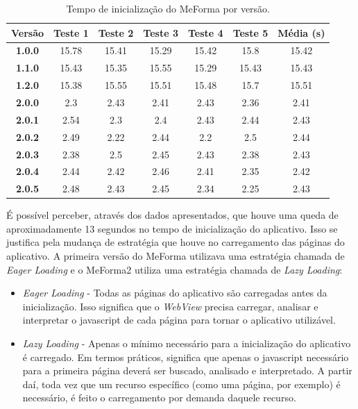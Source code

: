 \begin{table}[H]
\begin{center}
\caption{Tempo de inicialização do MeForma por versão.}
\begin{tabular}{ |c|c|c|c|c|c|c| }
\hline
 \textbf{Versão} & \textbf{Teste 1} & \textbf{Teste 2} & \textbf{Teste 3} & \textbf{Teste 4} & \textbf{Teste 5} & \textbf{Média (s)} \\ 
 \hline
 \textbf{1.0.0} & {15.78} &	{15.41} &	{15.29} &	{15.42} &	{15.8} &	{15.42} \\
 \hline 
 \textbf{1.1.0} & {15.43} &	{15.35} &	{15.55} &	{15.29} &	{15.43} &	{15.43} \\
 \hline 
 \textbf{1.2.0} & {15.38} &	{15.55} &	{15.51} &	{15.48} &	{15.7} &	{15.51} \\
 \hline 
 \textbf{2.0.0} & {2.3} &	{2.43} &	{2.41} &	{2.43} &	{2.36} &	{2.41} \\
 \hline 
 \textbf{2.0.1} & {2.54} &	{2.3} &	{2.4} &	{2.43} &	{2.44} &	{2.43} \\
 \hline 
 \textbf{2.0.2} & {2.49} &	{2.22} &	{2.44} &	{2.2} &	{2.5} &	{2.44} \\
 \hline 
 \textbf{2.0.3} & {2.38} &	{2.5} &	{2.45} &	{2.43} &	{2.38} &	{2.43} \\
 \hline 
 \textbf{2.0.4} & {2.44} &	{2.42} &	{2.46} &	{2.41} &	{2.35} &	{2.42} \\
 \hline 
 \textbf{2.0.5} & {2.48} &	{2.43} &	{2.45} &	{2.34} &	{2.25} &	{2.43} \\
 \hline 
\end{tabular}
\end{center}
\label{startuptime2}

\end{table}

É possível perceber, através dos dados apresentados, que houve uma queda de aproximadamente 13 segundos no tempo de inicialização do aplicativo. Isso se justifica pela mudança de estratégia que houve no carregamento das páginas do aplicativo. A primeira versão do MeForma utilizava uma estratégia chamada de \textit{Eager Loading} e o MeForma2 utiliza uma estratégia chamada de \textit{Lazy Loading}:
\begin{itemize}
    \item \textit{Eager Loading} - Todas as páginas do aplicativo são carregadas antes da inicialização. Isso significa que o \textit{WebView} precisa carregar, analisar e interpretar o javascript de cada página para tornar o aplicativo utilizável.
    \item \textit{Lazy Loading} - Apenas o mínimo necessário para a inicialização do aplicativo é carregado. Em termos práticos, significa que apenas o javascript necessário para a primeira página deverá ser buscado, analisado e interpretado. A partir daí, toda vez que um recurso específico (como uma página, por exemplo) é necessário, é feito o carregamento por demanda daquele recurso.
\end{itemize}

